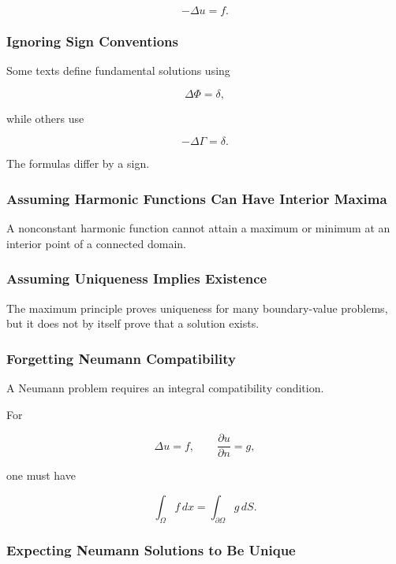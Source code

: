 \[
\boxed{
-\Delta u=f.
}
\]

\subsubsection{Ignoring Sign Conventions}

Some texts define fundamental solutions using

\[
\Delta\Phi=\delta,
\]

while others use

\[
-\Delta\Gamma=\delta.
\]

The formulas differ by a sign.

\subsubsection{Assuming Harmonic Functions Can Have Interior Maxima}

A nonconstant harmonic function cannot attain a maximum or minimum at an
interior point of a connected domain.

\subsubsection{Assuming Uniqueness Implies Existence}

The maximum principle proves uniqueness for many boundary-value problems,
but it does not by itself prove that a solution exists.

\subsubsection{Forgetting Neumann Compatibility}

A Neumann problem requires an integral compatibility condition.

For

\[
\Delta u=f,
\qquad
\frac{\partial u}{\partial n}=g,
\]

one must have

\[
\boxed{
\int_\Omega f\,dx
=
\int_{\partial\Omega}g\,dS.
}
\]

\subsubsection{Expecting Neumann Solutions to Be Unique}

